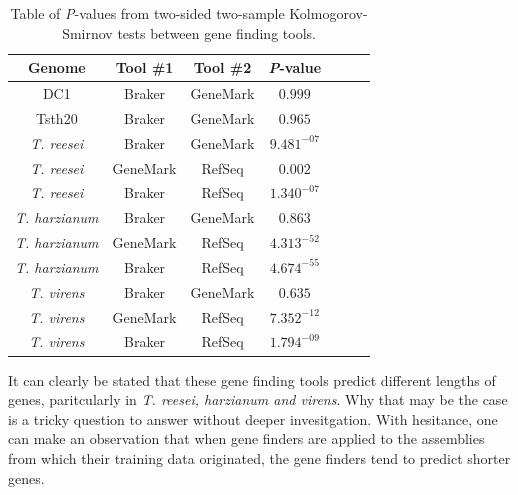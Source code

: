 \begin{table}
  \begin{center}
    \begin{tabular}{|c|c|c|c|c|c|c|}
      \hline
      Genome & Tool \#1 & Tool \#2 & \textit{P}-value  \\ \hline
      DC1 & Braker & GeneMark & $0.999$ \\ \hline
      Tsth20 & Braker & GeneMark & $0.965$ \\ \hline
      \textit{T. reesei} & Braker & GeneMark & $9.481^{-07}$ \\ \hline
      \textit{T. reesei} & GeneMark & RefSeq & $0.002$ \\ \hline
      \textit{T. reesei} & Braker & RefSeq & $1.340^{-07}$ \\ \hline
      \textit{T. harzianum} & Braker & GeneMark & $0.863$ \\ \hline
      \textit{T. harzianum} & GeneMark & RefSeq & $4.313^{-52}$ \\ \hline
      \textit{T. harzianum} & Braker & RefSeq & $4.674^{-55}$ \\ \hline
      \textit{T. virens} & Braker & GeneMark & $0.635$ \\ \hline
      \textit{T. virens} & GeneMark & RefSeq & $7.352^{-12}$ \\ \hline
      \textit{T. virens} & Braker & RefSeq & $1.794^{-09}$ \\ \hline
    \end{tabular}
  \end{center}
  \caption{Table of \textit{P}-values from two-sided two-sample
    Kolmogorov-Smirnov tests between gene finding tools.}
  \label{table:ks-2s}
\end{table}

It can clearly be stated that these gene finding tools predict
different lengths of genes, paritcularly in \textit{T. reesei,
  harzianum and virens}. Why that may be the case is a tricky question
to answer without deeper invesitgation. With hesitance, one can make
an observation that when gene finders are applied to the assemblies
from which their training data originated, the gene finders tend to
predict shorter genes.
